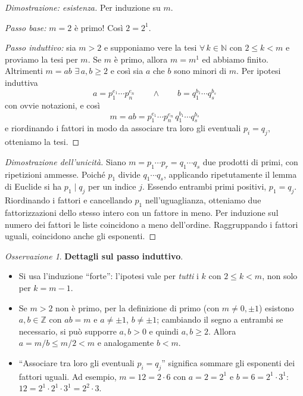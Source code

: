 \documentclass[11pt,a4paper]{article}
\newcommand{\N}{\mathbb{N}}
\newcommand{\Z}{\mathbb{Z}}
\theoremstyle{definition}
\theoremstyle{plain}
\theoremstyle{remark}
\newtheorem*{osservazione}{Osservazione}
\begin{document}
\begin{proof}[Dimostrazione: esistenza]
Per induzione su $m$.

\emph{Passo base:} $m=2$ è primo! Così $2=2^1$.

\emph{Passo induttivo:} sia $m>2$ e supponiamo vere la tesi $\forall\,k\in\N$ con $2\le k<m$ e proviamo la tesi per $m$. Se $m$ è primo, allora $m=m^1$ ed abbiamo finito. Altrimenti $m=ab$ $\exists\,a,b\ge2$ e così sia $a$ che $b$ sono minori di $m$. Per ipotesi induttiva
\[
a=p_1^{e_1}\cdots p_n^{e_n}\qquad\wedge\qquad b=q_1^{b_1}\cdots q_s^{b_s}
\]
con ovvie notazioni, e così
\[
m=ab=p_1^{e_1}\cdots p_n^{e_n}\,q_1^{b_1}\cdots q_s^{b_s}
\]
e riordinando i fattori in modo da associare tra loro gli eventuali $p_i=q_j$, otteniamo la tesi.
\end{proof}

\begin{proof}[Dimostrazione dell'unicità]
Siano $m=p_1\cdots p_r=q_1\cdots q_s$ due prodotti di primi, con ripetizioni ammesse. Poiché $p_1$ divide $q_1\cdots q_s$, applicando ripetutamente il lemma di Euclide si ha $p_1\mid q_j$ per un indice $j$. Essendo entrambi primi positivi, $p_1=q_j$. Riordinando i fattori e cancellando $p_1$ nell'uguaglianza, otteniamo due fattorizzazioni dello stesso intero con un fattore in meno. Per induzione sul numero dei fattori le liste coincidono a meno dell'ordine. Raggruppando i fattori uguali, coincidono anche gli esponenti.
\end{proof}

\begin{osservazione}
\textbf{Dettagli sul passo induttivo}. 
\begin{itemize}[nosep]
\item Si usa l'induzione ``forte'': l'ipotesi vale per \emph{tutti} i $k$ con $2\le k<m$, non solo per $k=m-1$.
\item Se $m>2$ non è primo, per la definizione di primo (con $m\neq0,\pm1$) esistono $a,b\in\Z$ con $ab=m$ e $a\neq\pm1$, $b\neq\pm1$; cambiando il segno a entrambi se necessario, si può supporre $a,b>0$ e quindi $a,b\ge2$. Allora $a=m/b\le m/2<m$ e analogamente $b<m$.
\item ``Associare tra loro gli eventuali $p_i=q_j$'' significa sommare gli esponenti dei fattori uguali. Ad esempio, $m=12=2\cdot6$ con $a=2=2^1$ e $b=6=2^1\cdot3^1$: $12=2^1\cdot2^1\cdot3^1=2^2\cdot3$.
\end{itemize}
\end{osservazione}
\end{document}
